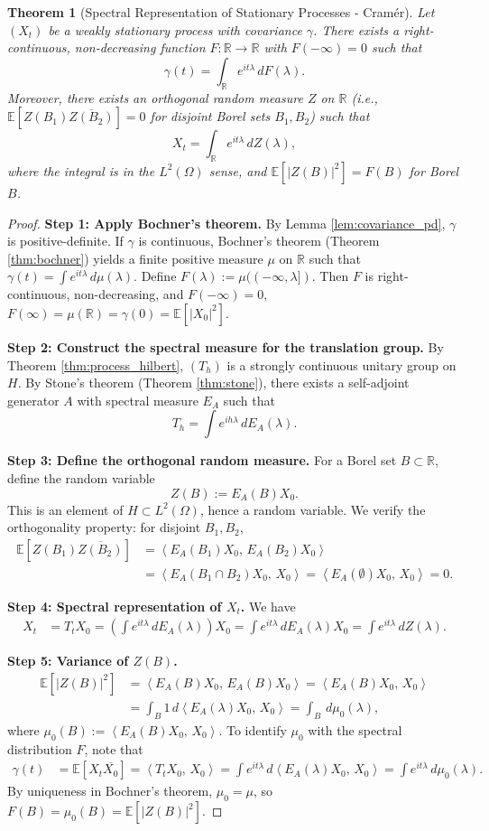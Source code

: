 \documentclass[11pt]{article}
\newtheorem{theorem}{Theorem}[section]
\theoremstyle{definition}
\theoremstyle{remark}
\newcommand{\R}{\mathbb{R}}
\newcommand{\E}{\mathbb{E}}
\newcommand{\1}{\mathbbm{1}}
\newcommand{\ip}[2]{\left\langle #1,\,#2 \right\rangle}
\begin{document}
\begin{theorem}[Spectral Representation of Stationary Processes - Cramér]\label{thm:cramer}
Let $(X_t)$ be a weakly stationary process with covariance $\gamma$. There exists a right-continuous, non-decreasing function $F:\R\to\R$ with $F(-\infty)=0$ such that
\[
\gamma(t)=\int_{\R}e^{it\lambda}\,dF(\lambda).
\]
Moreover, there exists an orthogonal random measure $Z$ on $\R$ (i.e., $\E[Z(B_1)\overline{Z(B_2)}]=0$ for disjoint Borel sets $B_1,B_2$) such that
\[
X_t=\int_{\R}e^{it\lambda}\,dZ(\lambda),
\]
where the integral is in the $L^2(\Omega)$ sense, and $\E[|Z(B)|^2]=F(B)$ for Borel $B$.
\end{theorem}

\begin{proof}
\textbf{Step 1: Apply Bochner's theorem.}
By Lemma \ref{lem:covariance_pd}, $\gamma$ is positive-definite. If $\gamma$ is continuous, Bochner's theorem (Theorem \ref{thm:bochner}) yields a finite positive measure $\mu$ on $\R$ such that $\gamma(t)=\int e^{it\lambda}\,d\mu(\lambda)$. Define $F(\lambda):=\mu((-\infty,\lambda])$. Then $F$ is right-continuous, non-decreasing, and $F(-\infty)=0$, $F(\infty)=\mu(\R)=\gamma(0)=\E[|X_0|^2]$.

\textbf{Step 2: Construct the spectral measure for the translation group.}
By Theorem \ref{thm:process_hilbert}, $(T_h)$ is a strongly continuous unitary group on $H$. By Stone's theorem (Theorem \ref{thm:stone}), there exists a self-adjoint generator $A$ with spectral measure $E_A$ such that
\[
T_h=\int e^{ih\lambda}\,dE_A(\lambda).
\]

\textbf{Step 3: Define the orthogonal random measure.}
For a Borel set $B\subset\R$, define the random variable
\[
Z(B):=E_A(B)X_0.
\]
This is an element of $H\subset L^2(\Omega)$, hence a random variable. We verify the orthogonality property: for disjoint $B_1,B_2$,
\begin{align*}
\E[Z(B_1)\overline{Z(B_2)}]&=\ip{E_A(B_1)X_0}{E_A(B_2)X_0}\\
&=\ip{E_A(B_1\cap B_2)X_0}{X_0}=\ip{E_A(\emptyset)X_0}{X_0}=0.
\end{align*}

\textbf{Step 4: Spectral representation of $X_t$.}
We have
\begin{align*}
X_t&=T_tX_0=\left(\int e^{it\lambda}\,dE_A(\lambda)\right)X_0=\int e^{it\lambda}\,dE_A(\lambda)X_0=\int e^{it\lambda}\,dZ(\lambda).
\end{align*}

\textbf{Step 5: Variance of $Z(B)$.}
\begin{align*}
\E[|Z(B)|^2]&=\ip{E_A(B)X_0}{E_A(B)X_0}=\ip{E_A(B)X_0}{X_0}\\
&=\int_B 1\,d\ip{E_A(\lambda)X_0}{X_0}=\int_B\,d\mu_0(\lambda),
\end{align*}
where $\mu_0(B):=\ip{E_A(B)X_0}{X_0}$. To identify $\mu_0$ with the spectral distribution $F$, note that
\begin{align*}
\gamma(t)&=\E[X_t\overline{X_0}]=\ip{T_tX_0}{X_0}=\int e^{it\lambda}\,d\ip{E_A(\lambda)X_0}{X_0}=\int e^{it\lambda}\,d\mu_0(\lambda).
\end{align*}
By uniqueness in Bochner's theorem, $\mu_0=\mu$, so $F(B)=\mu_0(B)=\E[|Z(B)|^2]$.
\end{proof}
\end{document}
